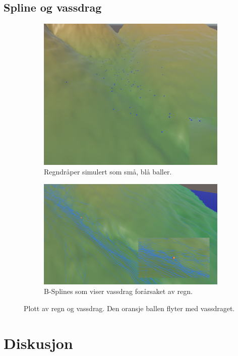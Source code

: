 \documentclass[norsk, doc, 11pt, a4paper]{apa7}  %
\begin{document}
\subsection{Spline og vassdrag}
\begin{figure}[H]
	\centering
	\begin{subfigure}{.5\textwidth}
		\centering
		\includegraphics[width=.9\linewidth]{figs/rain.png}
		\caption{Regndråper simulert som små, blå baller.}
	\end{subfigure}%
	\begin{subfigure}{.5\textwidth}
		\centering
		\includegraphics[width=\linewidth]{figs/water.png}
		\caption{B-Splines som viser vassdrag forårsaket av regn.}
	\end{subfigure}
	\caption{Plott av regn og vassdrag. Den oransje ballen flyter med vassdraget.}
\end{figure}

\section{Diskusjon}
\end{document}
